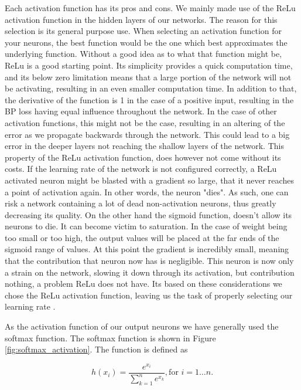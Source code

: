 Each activation function has its pros and cons. We mainly made use of the
\gls{ReLu} activation function in the hidden layers of our networks. The
reason for this selection is its general purpose use. When selecting an
activation function for your neurons, the best function would be the one which
best approximates the underlying function. Without a good idea as to what
that function might be, \gls{ReLu} is a good starting point. Its simplicity
provides a quick computation time, and its below zero limitation means that a
large portion of the network will not be activating, resulting in an even smaller
computation time. In addition to that, the derivative of the function is 1
in the case of a positive input, resulting in the \gls{BP} loss having equal
influence throughout the network. In the case of other activation functions,
this might not be the case, resulting in an altering of the error as we
propagate backwards through the network. This could lead to a big error in the
deeper layers not reaching the shallow layers of the network. This property of
the \gls{ReLu} activation function, does however not come without its costs.
If the learning rate of the network is not configured correctly, a \gls{ReLu}
activated neuron might be blasted with a gradient so large, that it never
reaches a point of activation again. In other words, the neuron "dies". As such,
one can risk a network containing a lot of dead non-activation neurons, thus
greatly decreasing its quality. On the other hand the sigmoid function, doesn't
allow its neurons to die. It can become victim to saturation. In the case of
weight being too small or too high, the output values will be placed at the far
ends of the sigmoid range of values. At this point the gradient is incredibly
small, meaning that the contribution that neuron now has is negligible. This
neuron is now only a strain on the network, slowing it down through its
activation, but contribution nothing, a problem \gls{ReLu} does not have. Its
based on these considerations we chose the \gls{ReLu} activation function,
leaving us the task of properly selecting our learning rate \citep{JiYan,
AndrejKarpathy, AvinashSharmaV}.

As the activation function of our output neurons we have generally
used the softmax function. The softmax function is shown in Figure
\ref{fig:softmax_activation}. The function is defined as

\begin{equation}
    h(x_i) = \frac{e^{x_i}}{\sum_{k=1}^n e^{x_k}}, \text{for $i = 1 \dots n$}.
\end{equation}

